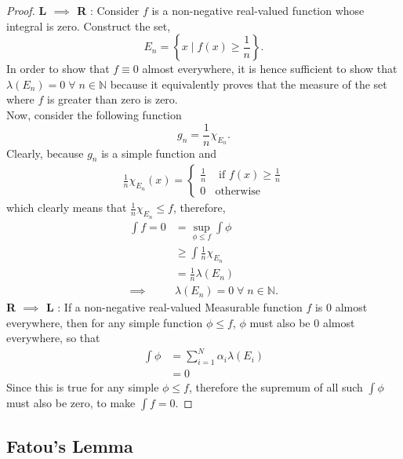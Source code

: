 \documentclass{article}
\theoremstyle{definition}
\theoremstyle{remark}
\theoremstyle{definition}
\theoremstyle{definition}
\theoremstyle{definition}
\newcommand{\where}{\;\vert\;}
\newcommand{\N}{\mathbb{N}}
\newcommand{\lm}[1]{\lambda\left (#1\right )}
\begin{document}
\begin{proof}
	\textbf{L $ \implies $ R} : Consider $ f $ is a non-negative real-valued function whose integral is zero. Construct the set,
	\[E_n = \left \{ x\where f(x) \ge \frac{1}{n}\right \}.\]
	In order to show that $ f \equiv 0$ almost everywhere, it is hence sufficient to show that $ \lm{E_n} = 0 \;\forall\; n\in\N$ because it equivalently proves that the measure of the set where $ f $ is greater than zero is zero.\\
	Now, consider the following function
	\[g_n = \frac{1}{n} \chi_{E_n}.\]
	Clearly, because $ g_n $ is a simple function and 
	\begin{equation*}
		\begin{split}
			\frac{1}{n} \chi_{E_n}(x) = \begin{cases}
				\frac{1}{n}&\text{ if } f(x) \ge \frac{1}{n}\\
				0 &\text{otherwise}
			\end{cases}
		\end{split}
	\end{equation*}
which clearly means that $ \frac{1}{n}\chi_{E_n} \le f $, therefore,
	\begin{align*}
		\int f = 0 &= \sup_{\phi \le f} \int \phi\\
		&\ge \int \frac{1}{n} \chi_{E_n}\\
		&= \frac{1}{n} \lm{E_n}\\
		\implies & \lm{E_n} = 0\; \forall \;n\in \N.
	\end{align*}
\textbf{R $ \implies  $ L} : If a non-negative real-valued Measurable function $f $ is $ 0 $ almost everywhere, then for any simple function $ \phi \le f $, $ \phi $ must also be $ 0 $ almost everywhere, so that 
\begin{equation*}
	\begin{split}
		\int \phi &= \sum_{i = 1}^{N} \alpha_{i} \lm{E_i}\\
		&= 0
	\end{split}
\end{equation*}
Since this is true for any simple $ \phi \le f$, therefore the supremum of all such $ \int\phi $ must also be zero, to make $ \int f = 0 $. 
\end{proof}
\hrulefill

\newpage
\subsection{Fatou's Lemma}
\end{document}
